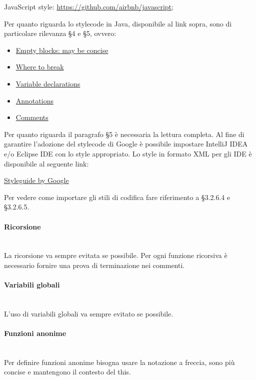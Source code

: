 \begin{center}
JavaScript style: \url{https://github.com/airbnb/javascript};
\end{center}

Per quanto riguarda lo stylecode in Java, disponibile al link sopra, sono di particolare rilevanza §4 e §5, ovvero:
\begin{itemize}
\item \href{https://google.github.io/styleguide/javaguide.html#s4.1.3-braces-empty-blocks}{Empty blocks: may be concise}
\item \href{https://google.github.io/styleguide/javaguide.html#s4.5.1-line-wrapping-where-to-break}{Where to break}
\item \href{https://google.github.io/styleguide/javaguide.html#s4.8.2-variable-declarations}{Variable declarations}
\item \href{https://google.github.io/styleguide/javaguide.html#s4.8.5-annotations}{Annotations}
\item \href{https://google.github.io/styleguide/javaguide.html#s4.8.6-comments}{Comments}
\end{itemize}
Per quanto riguarda il paragrafo §5 è necessaria la lettura completa.
Al fine di garantire l'adozione del stylecode di Google è possibile impostare IntelliJ IDEA e/o Eclipse IDE con lo style appropriato.
Lo style in formato {XML} per gli IDE è disponibile al seguente link:
\begin{center}
\href{https://github.com/google/styleguide}{Styleguide by Google}
\end{center}
Per vedere come importare gli stili di codifica fare riferimento a §3.2.6.4 e §3.2.6.5.
\paragraph{Ricorsione}\mbox{}\\
La ricorsione va sempre evitata se possibile. Per ogni funzione ricorsiva è necessario fornire
una prova di terminazione nei commenti.

\paragraph{Variabili globali}\mbox{}\\
L'uso di variabili globali va sempre evitato se possibile.

\paragraph{Funzioni anonime}\mbox{}\\
Per definire funzioni anonime bisogna usare la notazione a freccia, sono più concise e
mantengono il contesto del {this}.

